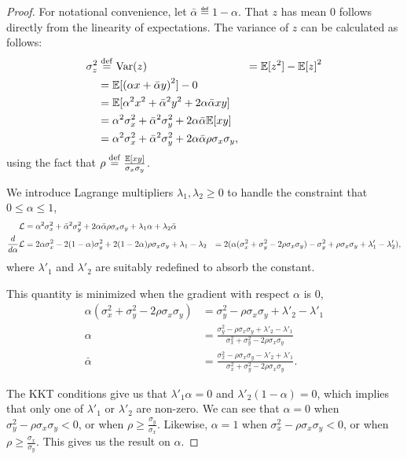 \begin{proof}
  \newcommand{\alphab}{\bar{\alpha}}
  For notational convenience, let $\alphab \eqdef 1 - \alpha$.
  That $z$ has mean $0$ follows directly from the linearity of expectations.
  The variance of $z$ can be calculated as follows:
  \begin{align*}
    \sigma^2_z &\eqdef \var(z) 
    &= \E[z^2] - {\E[z]}^2 \\
    &= \E[{(\alpha x+ \alphab y)}^2] - 0 \\
            &= \E[\alpha^2 x^2 + \alphab^2 y^2 + 2 \alpha \alphab x y] \\
            &= \alpha^2 \sigma_x^2 + \alphab^2 \sigma_y^2 + 2 \alpha \alphab \E[x y] \\
            &= \alpha^2 \sigma_x^2 + \alphab^2 \sigma_y^2 + 2 \alpha \alphab \rho \sigma_x \sigma_y,
  \end{align*}
  using the fact that $\rho \stackrel{\rm def}{=} \frac{\mathbb{E}[xy]}{\sigma_x \sigma_y}$.

  We introduce Lagrange multipliers $\lambda_1, \lambda_2 \ge 0$ to handle the constraint that $0 \le \alpha \le 1$,
  \begin{align*}
    \sL &= 
    \alpha^2 \sigma_x^2 + \alphab^2 \sigma_y^2 + 2 \alpha \alphab \rho \sigma_x \sigma_y
    + \lambda_1 \alpha + \lambda_2 \alphab \\
    \frac{d}{d\alpha} \sL &= 
    2 \alpha \sigma_x^2 - 2(1 - \alpha) \sigma_y^2 + 2 (1 - 2\alpha) \rho \sigma_x \sigma_y + \lambda_1 - \lambda_2
&= 
    2 (\alpha (\sigma_x^2 + \sigma_y^2 - 2 \rho \sigma_x\sigma_y) - \sigma_y^2 + \rho \sigma_x \sigma_y + \lambda'_1 - \lambda'_2),
  \end{align*}
  where $\lambda'_1$ and $\lambda'_2$ are suitably redefined to absorb the constant.

  This quantity is minimized when the gradient with respect $\alpha$ is $0$,
  \begin{align*}
    \alpha (\sigma_x^2 + \sigma_y^2 - 2\rho \sigma_x \sigma_y) &= \sigma_y^2 - \rho \sigma_x \sigma_y + \lambda'_2 - \lambda'_1 \\
    \alpha &= \frac{\sigma_y^2 - \rho \sigma_x \sigma_y + \lambda'_2 - \lambda'_1}{\sigma_x^2 + \sigma_y^2 - 2\rho \sigma_x \sigma_y} \\
    \alphab &= \frac{\sigma_x^2 - \rho \sigma_x \sigma_y - \lambda'_2 + \lambda'_1}{\sigma_x^2 + \sigma_y^2 - 2\rho \sigma_x \sigma_y}.
  \end{align*}

  The KKT conditions give us that $\lambda'_1 \alpha = 0$ and $\lambda'_2 (1-\alpha) = 0$, which implies that only one of $\lambda'_1$ or $\lambda'_2$ are non-zero.
  We can see that $\alpha = 0$ when $\sigma_y^2 - \rho \sigma_x \sigma_y < 0$, or when $\rho \ge \frac{\sigma_y}{\sigma_x}$.
  Likewise, $\alpha = 1$ when $\sigma_x^2 - \rho \sigma_x \sigma_y < 0$, or when $\rho \ge \frac{\sigma_x}{\sigma_y}$.
  This gives us the result on $\alpha$.


\end{proof}
